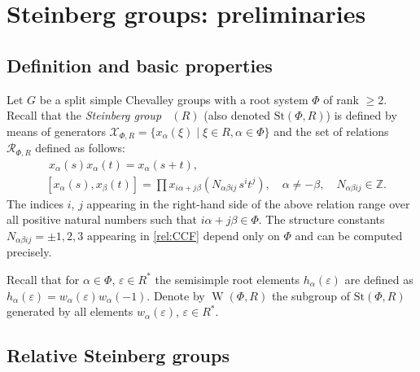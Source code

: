 \documentclass[oneside,12pt]{amsart}
\numberwithin{equation}{section}
\numberwithin{lem}{section}
\theoremstyle{definition}
\theoremstyle{remark}
\DeclareMathOperator{\St}{St^G}
\DeclareMathOperator{\WW}{W}
\newcommand{\Stb}{\mathrm{St}}
\begin{document}
\section{Steinberg groups: preliminaries}


\subsection{Definition and basic properties}
Let $G$ be a split simple Chevalley groups with a root system $\Phi$ of rank $\geq 2$.
Recall that the \emph{Steinberg group} $\St(R)$ (also denoted $\Stb(\Phi, R)$) is defined by means of generators 
$\mathcal{X}_{\Phi, R} = \{x_{\alpha}(\xi) \mid \xi\in R, \alpha\in\Phi\}$ and the set of relations $\mathcal{R}_{\Phi, R}$ defined as follows:
\begin{align}
& \phantom{[}
x_\alpha(s) x_\alpha(t) = x_\alpha(s+t), \label{rel:add}\\
& [x_\alpha(s), x_\beta(t)] = \prod x_{i\alpha + j\beta}\left(N_{\alpha\beta ij}\, s^i t^j\right), \quad \alpha\neq-\beta, \quad N_{\alpha\beta ij}\in\mathbb{Z}. \label{rel:CCF}
\end{align} 
The indices $i$, $j$ appearing in the right-hand side of the above relation range over all positive natural numbers such that $i\alpha + j\beta\in\Phi$.
The structure constants $N_{\alpha \beta i j}=\pm 1,2,3$ appearing in \eqref{rel:CCF} depend only on $\Phi$ and can be computed precisely.

Recall that for $\alpha\in\Phi$, $\varepsilon\in R^*$ the semisimple root elements $h_\alpha(\varepsilon)$ are defined as $h_\alpha(\varepsilon)=w_\alpha(\varepsilon)w_\alpha(-1)$.
Denote by $\WW(\Phi, R)$ the subgroup of $\Stb(\Phi, R)$ generated by all elements $w_\alpha(\varepsilon)$, $\varepsilon\in R^*$.


\subsection{Relative Steinberg groups}
\end{document}
